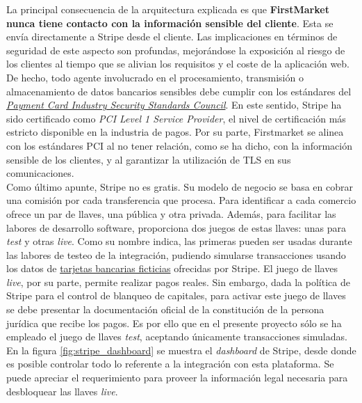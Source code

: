 \documentclass[a4paper]{article}
\begin{document}
    La principal consecuencia de la arquitectura explicada es que \textbf{FirstMarket nunca tiene contacto con la información sensible del cliente}. Esta se envía directamente a Stripe desde el cliente. Las implicaciones en términos de seguridad de este aspecto son profundas, mejorándose la exposición al riesgo de los clientes al tiempo que se alivian los requisitos y el coste de la aplicación web. De hecho, todo agente involucrado en el procesamiento, transmisión o almacenamiento de datos bancarios sensibles debe cumplir con los estándares del \href{https://www.pcisecuritystandards.org/pci_security/}{\emph{Payment Card Industry Security Standards Council}}. En este sentido, Stripe ha sido certificado como \emph{PCI Level 1 Service Provider}, el nivel de certificación más estricto disponible en la industria de pagos. Por su parte, Firstmarket se alinea con los estándares PCI al no tener relación, como se ha dicho, con la información sensible de los clientes, y al garantizar la utilización de TLS en sus comunicaciones.
    \\
    
    Como último apunte, Stripe no es gratis. Su modelo de negocio se basa en cobrar una comisión por cada transferencia que procesa. Para identificar a cada comercio ofrece un par de llaves, una pública y otra privada. Además, para facilitar las labores de desarrollo software, proporciona dos juegos de estas llaves: unas para \emph{test} y otras \emph{live}. Como su nombre indica, las primeras pueden ser usadas durante las labores de testeo de la integración, pudiendo simularse transacciones usando los datos de \href{https://stripe.com/docs/payments/accept-a-payment#web-test-integration}{tarjetas bancarias ficticias} ofrecidas por Stripe. El juego de llaves \emph{live}, por su parte, permite realizar pagos reales. Sin embargo, dada la política de Stripe para el control de blanqueo de capitales, para activar este juego de llaves se debe presentar la documentación oficial de la constitución de la persona jurídica que recibe los pagos. Es por ello que en el presente proyecto sólo se ha empleado el juego de llaves \emph{test}, aceptando únicamente transacciones simuladas. En la figura \ref{fig:stripe_dashboard} se muestra el \emph{dashboard} de Stripe, desde donde es posible controlar todo lo referente a la integración con esta plataforma. Se puede apreciar el requerimiento para proveer la información legal necesaria para desbloquear las llaves \emph{live}.
    
\end{document}
